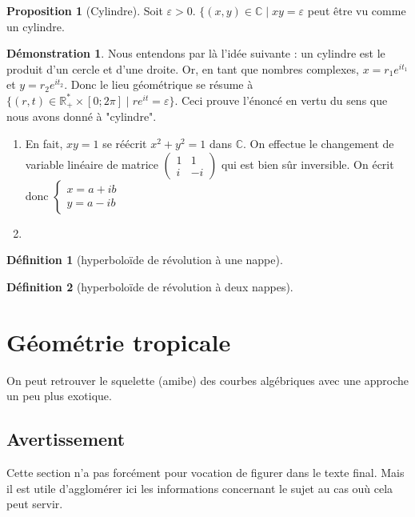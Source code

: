 \documentclass{article}
\newcommand{\C}{\mathbb{C}} %
\newcommand{\R}{\mathbb{R}} %
\theoremstyle{definition} %
\newtheorem{defi}{Définition}
\newtheorem{prop}{Proposition}
\newtheorem{dem}{Démonstration}
\newcommand{\1}{\mathbb{1}} %
\begin{document}
\begin{prop}[Cylindre]
    Soit $\varepsilon >0$.
$\{(x,y) \in \C \mid xy=\varepsilon$ peut être vu comme un cylindre.
\end{prop}

\begin{dem}
Nous entendons par là l'idée suivante : un cylindre est le produit d'un cercle et d'une droite.
Or, en tant que nombres complexes, $x=r_1 e^{i t_1} $ et $y=r_2 e^{i t_2}$.
Donc le lieu géométrique se résume à $\{ (r,t)\in \R_+^* \times [0;2 \pi] \mid r e^{i t} = \varepsilon \}$.
Ceci prouve l'énoncé en vertu du sens que nous avons donné à "cylindre".
\end{dem}


\begin{enumerate}
\item En fait, $xy=1$ se réécrit $x^2 + y^2 = 1$ dans $\C$.
On effectue le changement de variable linéaire de matrice
$\begin{pmatrix}
1 & 1\\
i & -i
\end{pmatrix}$ qui est bien sûr inversible.
On écrit donc
$
\begin{cases}
x=a+ib \\
y=a-ib
\end{cases}$
\item 
\end{enumerate}


\begin{defi}[hyperboloïde de révolution à une nappe]

\end{defi}

\begin{defi}[hyperboloïde de révolution à deux nappes]

\end{defi}

\section{Géométrie tropicale}

On peut retrouver le squelette (amibe) des courbes algébriques avec une approche un peu plus exotique.

\subsection{Avertissement}

Cette section n'a pas forcément pour vocation de figurer dans le texte final.
Mais il est utile d'agglomérer ici les informations concernant le sujet au cas ouù cela peut servir.
\end{document}
